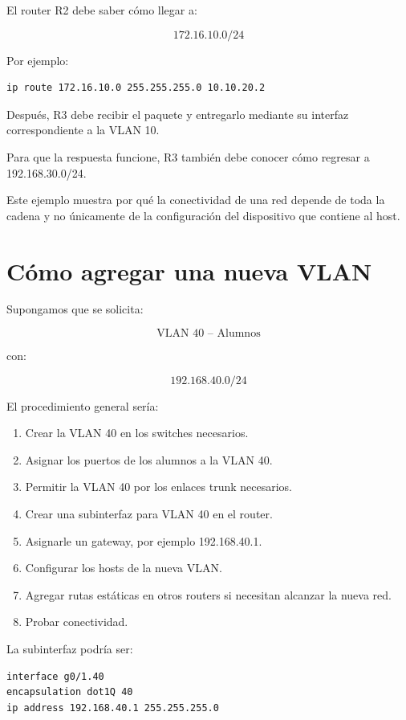 \documentclass[12pt]{article}
\begin{document}
El router R2 debe saber cómo llegar a:

\[
172.16.10.0/24
\]

Por ejemplo:

\begin{lstlisting}
ip route 172.16.10.0 255.255.255.0 10.10.20.2
\end{lstlisting}

Después, R3 debe recibir el paquete y entregarlo mediante su interfaz
correspondiente a la VLAN 10.

Para que la respuesta funcione, R3 también debe conocer cómo regresar a
192.168.30.0/24.

Este ejemplo muestra por qué la conectividad de una red depende de toda la
cadena y no únicamente de la configuración del dispositivo que contiene
al host.


\section{Cómo agregar una nueva VLAN}

Supongamos que se solicita:

\[
\text{VLAN 40 -- Alumnos}
\]

con:

\[
192.168.40.0/24
\]

El procedimiento general sería:

\begin{enumerate}
    \item Crear la VLAN 40 en los switches necesarios.
    \item Asignar los puertos de los alumnos a la VLAN 40.
    \item Permitir la VLAN 40 por los enlaces trunk necesarios.
    \item Crear una subinterfaz para VLAN 40 en el router.
    \item Asignarle un gateway, por ejemplo 192.168.40.1.
    \item Configurar los hosts de la nueva VLAN.
    \item Agregar rutas estáticas en otros routers si necesitan alcanzar
    la nueva red.
    \item Probar conectividad.
\end{enumerate}

La subinterfaz podría ser:

\begin{lstlisting}
interface g0/1.40
encapsulation dot1Q 40
ip address 192.168.40.1 255.255.255.0
\end{lstlisting}
\end{document}

